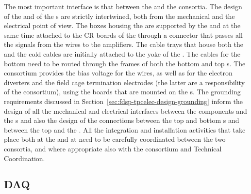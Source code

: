 The most important interface is that between the 
and the  consortia. The design of the 
and of the s are strictly intertwined, both from the
mechanical and the electrical point of view. The 
boxes housing the  are supported by the 
and at the same time attached to the CR boards of the 
through a connector that passes all the signals from the wires to
the  amplifiers. The cable trays that house both the
 and the  cold cables are initially
attached to the yoke of the . The 
cables for the bottom  need to be routed through the 
frames of both the bottom and top s. The 
consortium provides the bias voltage for the 
wires, as well as for the electron diverters and the field
cage termination electrodes (the latter are a responsibility of
the  consortium), using the  boards that are mounted
on the s. The grounding requirements discussed in
Section~\ref{sec:fdsp-tpcelec-design-grounding} inform the
design of all the mechanical and electrical interfaces between
the  components and the s and also the
design of the connections between the top and bottom s
and between the top  and the . All the
integration and installation activities that take place both at
the  and at \surf need to be carefully coordinated between
the two consortia, and where appropriate also with the 
consortium and Technical Coordination.

\subsection{DAQ}
\label{sec:fdsp-tpcelec-interfaces-daq}

